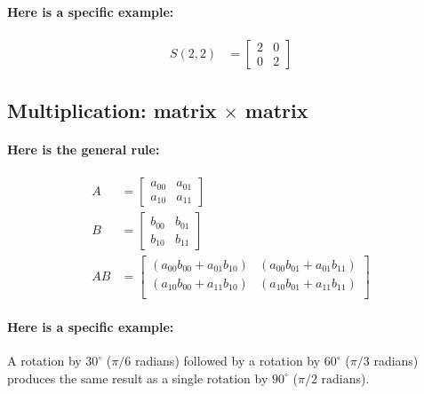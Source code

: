 \documentclass[twoside]{article}
\begin{document}
\paragraph{Here is a specific example:}

\begin{align*}
  S( 2, 2 ) & = \left[ \begin{array}{rr}
    2 & 0 \\
    0 & 2
    \end{array} \right]
  \end{align*}

\subsection{Multiplication: matrix $\times$ matrix}

\paragraph{Here is the general rule:}

\begin{align*}
  A & = \left[ \begin{array}{rr}
    a_{00} & a_{01} \\
    a_{10} & a_{11}
    \end{array} \right] \\
  B & = \left[ \begin{array}{rr}
    b_{00} & b_{01} \\
    b_{10} & b_{11}
    \end{array} \right] \\
  AB & = \left[ \begin{array}{rr}
    (a_{00} b_{00} + a_{01} b_{10}) & (a_{00} b_{01} + a_{01} b_{11}) \\
    (a_{10} b_{00} + a_{11} b_{10}) & (a_{10} b_{01} + a_{11} b_{11}) \\
    \end{array} \right]
  \end{align*}

\paragraph{Here is a specific example:}

A rotation by $30^\circ$ ($\pi/6$ radians) followed by a rotation 
by $60^\circ$ ($\pi/3$ radians) produces the same result as a
single rotation by $90^\circ$ ($\pi/2$ radians).
\end{document}
